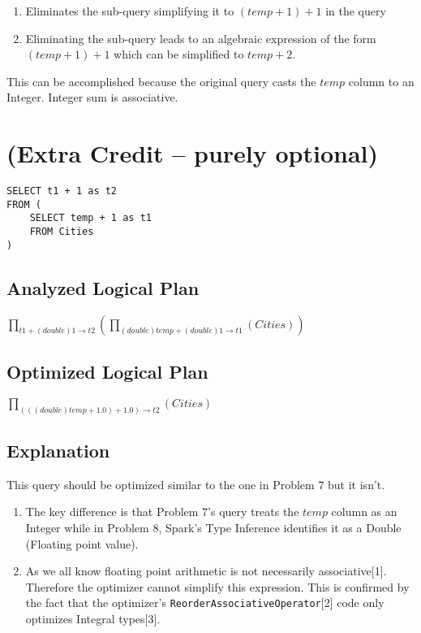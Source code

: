 \documentclass[12pt]{article}
\begin{document}
\begin{enumerate}
\item Eliminates the sub-query simplifying it to $(temp + 1) + 1$ in the query
\item Eliminating the sub-query leads to an algebraic expression of the form $(temp + 1) + 1$ which can be simplified to $temp + 2$.
\end{enumerate}

This can be accomplished because the original query casts the $temp$ column to an Integer. Integer sum is associative.
\newpage

\section{(Extra Credit -- purely optional)}
\begin{verbatim}
SELECT t1 + 1 as t2
FROM (
    SELECT temp + 1 as t1
    FROM Cities
)
\end{verbatim}

\subsection*{Analyzed Logical Plan}
$\prod_{t1 + (double)1 \rightarrow t2} ( \prod_{(double) temp + (double) 1 \rightarrow t1} (Cities) )$

\subsection*{Optimized Logical Plan}
$\prod_{(((double) temp + 1.0) + 1.0) \rightarrow t2}(Cities)$

\subsection*{Explanation}

This query should be optimized similar to the one in Problem 7 but it isn't. 

\begin{enumerate}
\item The key difference is that Problem 7's query treats the $temp$ column as an Integer while in Problem 8, Spark's Type Inference identifies it as a Double (Floating point value).

\item As we all know floating point arithmetic is not necessarily associative[1]. Therefore the optimizer cannot simplify this expression. This is confirmed by the fact that the optimizer's \texttt{ReorderAssociativeOperator}[2] code only optimizes Integral types[3].
\end{enumerate}
\end{document}
